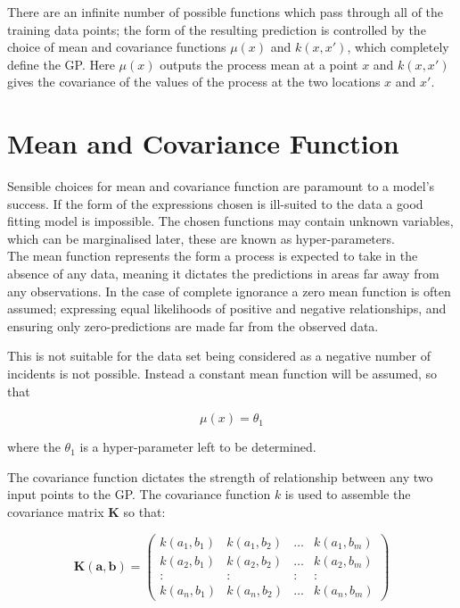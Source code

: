\documentclass[a4paper,11pt]{report}
\begin{document}
There are an infinite number of possible functions which pass through all of the training data points; the form of the resulting prediction is controlled by the choice of mean and covariance functions \(\mu (x)\) and \( k(x,x')\), which completely define the GP. 
Here \(\mu (x)\) outputs the process mean at a point \(x\) and \( k(x,x')\) gives the covariance of the values of the process at the two locations \(x\) and \(x'\).

\section{Mean and Covariance Function}

Sensible choices for mean and covariance function are paramount to a model's success. If the form of the expressions chosen is ill-suited to the data a good fitting model is impossible. The chosen functions may contain unknown variables, which can be marginalised later, these are known as hyper-parameters. \\

The mean function represents the form a process is expected to take in the absence of any data, meaning it dictates the predictions in areas far away from any observations. In the case of complete ignorance a zero mean function is often assumed; expressing equal likelihoods of positive and negative relationships, and ensuring only zero-predictions are made far from the observed data. \par

This is not suitable for the data set being considered as a negative number of incidents is not possible. Instead a constant mean function will be assumed, so that

\begin{equation} \label{eq:GPmean}
\mu (x) = \theta_1
\end{equation}

where the \(\theta_1\) is a hyper-parameter left to be determined.

The covariance function dictates the strength of relationship between any two input points to the GP. The covariance function \(k\) is used to assemble the covariance matrix \(\mathbf{K}\) so that: 

\begin{equation}
\mathbf{K(a,b)} =  \left( \begin{array}{cccc}
k(a_1,b_1) & k(a_1,b_2) &  \dots & k(a_1,b_m) \\
k(a_2,b_1) & k(a_2,b_2) &  \dots & k(a_2,b_m) \\
: & : & : & : \\
k(a_n,b_1) & k(a_n,b_2) &  \dots & k(a_n,b_m)  \end{array} \right) 
\end{equation}
\end{document}
